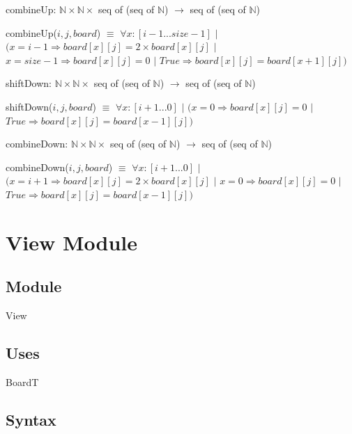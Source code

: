\documentclass[12pt]{article}
\begin{document}
\bigskip
\bigskip

\noindent combineUp: $\mathbb{N} \times \mathbb{N} \times$ seq of (seq of $\mathbb{N}$) $\rightarrow$ seq of (seq of $\mathbb{N}$)

\medskip

\noindent combineUp($i, j, board$) $\equiv$ $\forall x : [i-1...size-1]$ $|$ $(x = i-1 \Rightarrow board[x][j] = 2 \times board[x][j]$ $|$ $x = size-1 \Rightarrow board[x][j] = 0$ $|$ $True \Rightarrow board[x][j] = board[x+1][j])$

\bigskip
\bigskip

\noindent shiftDown: $\mathbb{N} \times \mathbb{N} \times$ seq of (seq of $\mathbb{N}$) $\rightarrow$ seq of (seq of $\mathbb{N}$) 

\medskip

\noindent shiftDown($i, j, board$) $\equiv$ $\forall x : [i+1...0]$ $|$ $(x = 0 \Rightarrow board[x][j] = 0$ $|$ $True \Rightarrow board[x][j] = board[x-1][j])$

\bigskip
\bigskip

\noindent combineDown: $\mathbb{N} \times \mathbb{N} \times$ seq of (seq of $\mathbb{N}$) $\rightarrow$ seq of (seq of $\mathbb{N}$)

\medskip

\noindent combineDown($i, j, board$) $\equiv$ $\forall x : [i+1...0]$ $|$ $(x = i+1 \Rightarrow board[x][j] = 2 \times board[x][j]$ $|$ $x = 0 \Rightarrow board[x][j] = 0$ $|$ $True \Rightarrow board[x][j] = board[x-1][j])$

\bigskip
\bigskip


\newpage

\section* {View Module}

\subsection* {Module}

View

\subsection* {Uses}

BoardT

\subsection* {Syntax}
\end{document}
